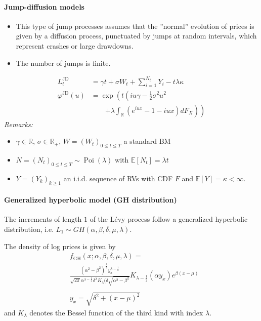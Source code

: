 \documentclass[a4paper,landscape,7pt,fleqn]{scrartcl}
\DeclareMathOperator{\Poi}{Poi}					%
\begin{document}
\begin{multicols*}{3}
\paragraph{Jump-diffusion models}
\begin{itemize}
\item This type of jump processes assumes that the ''normal'' evolution of prices is given by a diffusion process, punctuated by jumps at random intervals, which represent crashes or large drawdowns.
\item The number of jumps is finite.
\end{itemize}
\begin{align*}
L_t^\text{JD} &= \gamma t + \sigma W_t + \sum_{i=1}^{N_t} Y_i - t \lambda \kappa \\
\varphi^\text{JD}(u) &= \exp \left( t \left( i u \gamma - \frac{1}{2} \sigma^2 u^2 \right. \right. \\
& \qquad \left. \left. + \lambda \int_\mathbb{R} \left( e^{i u x} - 1 - i u x \right) dF_X \right) \right)
\end{align*}
\textit{Remarks:}
\begin{itemize}
\item $\gamma \in \mathbb{R}$, $\sigma \in \mathbb{R}_+$, $W = (W_t)_{0 \leq t \leq T}$ a standard BM
\item $N = (N_t)_{0 \leq t \leq T} \sim \Poi(\lambda)$ with $\mathbb{E} \left[ N_t \right] = \lambda t$
\item $Y = (Y_k)_{k \geq 1}$ an i.i.d. sequence of RVs with CDF $F$ and $\mathbb{E}[Y] = \kappa < \infty$.
\end{itemize}

\paragraph{Generalized hyperbolic model (GH distribution)}
The increments of length $1$ of the Lévy process follow a generalized hyperbolic distribution, i.e. $L_1 \sim GH(\alpha, \beta, \delta, \mu, \lambda)$.

The density of log prices is given by
\begin{align*}
& f_\text{GH}(x; \alpha, \beta, \delta, \mu, \lambda) = \\
& \frac{(\alpha^2 - \beta^2)^\frac{\lambda}{2} y_x^{\lambda - \frac{1}{2}}}{\sqrt{2 \pi} \alpha^{\lambda - \frac{1}{2}} \delta^\lambda K_\lambda (\delta \sqrt{\alpha^2 - \beta^2}} K_{\lambda - \frac{1}{2}} (\alpha y_x) e^{\beta (x-\mu)} \\ \\
& y_x = \sqrt{\delta^2 + (x-\mu)^2}
\end{align*}
and $K_\lambda$ denotes the Bessel function of the third kind with index $\lambda$.


\end{multicols*}
\end{document}
